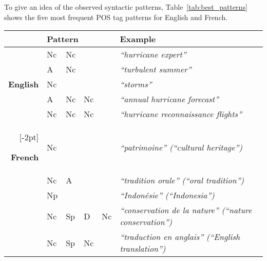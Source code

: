     To give an idea of the observed syntactic patterns,
    Table~\ref{tab:best_patterns} shows the five most frequent POS tag patterns
    for English and French.
    \begin{table*}
      \centering
      \begin{tabular}{@{~}rl@{~~}l@{~~}l@{~~}ll@{~}}
        \toprule
        & \multicolumn{4}{l}{\hspace{-.5em}\textbf{Pattern}} & \textbf{Example}\\
        \midrule
        \multirow{5}{*}[-2pt]{\begin{sideways}\textbf{English}\end{sideways}} & Nc & Nc & & & \textit{``hurricane expert''}\\ %
        & A & Nc & & & \textit{``turbulent summer''}\\ %
        & Nc & & & & \textit{``storms''}\\ %
        & A & Nc & Nc & & \textit{``annual hurricane forecast''}\\ %
        & Nc & Nc & Nc & & \textit{``hurricane reconnaissance flights''}\\ %
        \addlinespace[1.5\defaultaddspace]
        \multirow{5}{*}[-2pt]{\begin{sideways}\textbf{French}\end{sideways}} & Nc & & & & \textit{``patrimoine'' (``cultural heritage'')}\\ %
        & Nc & A & & & \textit{``tradition orale'' (``oral tradition'')}\\ %
        & Np & & & & \textit{``Indonésie'' (``Indonesia'')}\\ %
        & Nc & Sp & D & Nc & \textit{``conservation de la nature'' (``nature conservation'')}\\ %
        & Nc & Sp & Nc & & \textit{``traduction en anglais'' (``English translation'')}\\ %
        \bottomrule
      \end{tabular}
      \caption{Frequent part-of-speech patterns (Multex format) for English and
               French keyphrases. \label{tab:best_patterns}}
    \end{table*}


